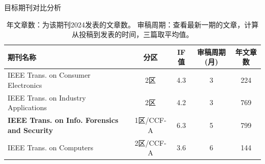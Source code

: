\documentclass[11pt,a4paper]{article}
\begin{document}
\begin{table}[ht]
    \centering
    \caption{目标期刊对比分析}
    \label{tab:journal}
    \begin{tabular}{lcccc}
        \toprule
        期刊名称 & 分区 & IF值 & 审稿周期(月) &年文章数 \\
        \midrule
        IEEE Trans. on Consumer Electronics & 2区 & 4.3 & 3 & 224 \\
        IEEE Trans. on Industry Applications & 2区 & 4.2 & 3 & 769 \\
        \textbf{IEEE Trans. on Info. Forensics and Security} & 1区/CCF-A & 6.3 & 5 & 799 \\
        IEEE Trans. on Computers & 2区/CCF-A & 3.6 & 6 & 144 \\
        \bottomrule
    \end{tabular}
    \small
    \caption*{年文章数：为该期刊2024发表的文章数。 审稿周期：查看最新一期的文章，计算从投稿到发表的时间，三篇取平均值。}
\end{table}



% 
% 
\end{document}

